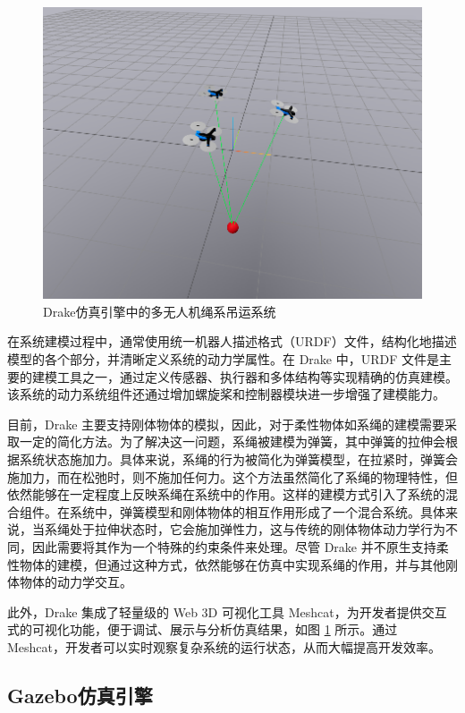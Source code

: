 \documentclass[lang=chs, degree=master, blindreview=true, winfonts=true]{yanputhesis}
\begin{document}
\begin{figure}[hbt!]
	\centering
	\includegraphics[width=36pc]{picture/5_1.png} 
	\caption{Drake仿真引擎中的多无人机绳系吊运系统} 
	\label{5_1}
\end{figure}

在系统建模过程中，通常使用统一机器人描述格式（URDF）文件，结构化地描述模型的各个部分，并清晰定义系统的动力学属性。在 Drake 中，URDF 文件是主要的建模工具之一，通过定义传感器、执行器和多体结构等实现精确的仿真建模。该系统的动力系统组件还通过增加螺旋桨和控制器模块进一步增强了建模能力。

目前，Drake 主要支持刚体物体的模拟，因此，对于柔性物体如系绳的建模需要采取一定的简化方法。为了解决这一问题，系绳被建模为弹簧，其中弹簧的拉伸会根据系统状态施加力。具体来说，系绳的行为被简化为弹簧模型，在拉紧时，弹簧会施加力，而在松弛时，则不施加任何力。这个方法虽然简化了系绳的物理特性，但依然能够在一定程度上反映系绳在系统中的作用。这样的建模方式引入了系统的混合组件。在系统中，弹簧模型和刚体物体的相互作用形成了一个混合系统。具体来说，当系绳处于拉伸状态时，它会施加弹性力，这与传统的刚体物体动力学行为不同，因此需要将其作为一个特殊的约束条件来处理。尽管 Drake 并不原生支持柔性物体的建模，但通过这种方式，依然能够在仿真中实现系绳的作用，并与其他刚体物体的动力学交互。

此外，Drake 集成了轻量级的 Web 3D 可视化工具 Meshcat，为开发者提供交互式的可视化功能，便于调试、展示与分析仿真结果，如图 \ref{5_1} 所示。通过 Meshcat，开发者可以实时观察复杂系统的运行状态，从而大幅提高开发效率。

\subsection{Gazebo仿真引擎}
\end{document}
